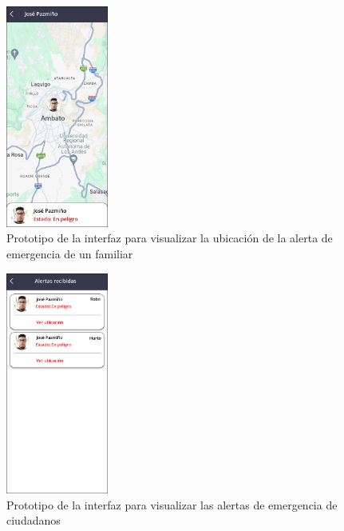 \begin{figure}[H]
      \centering
      \includegraphics[width=0.3\textwidth]{chapters/III-resultados-y-discusion/resources/images/prototipo-ubicacion-alerta-mobile.png}
      \caption{Prototipo de la interfaz para visualizar la ubicación de la alerta de emergencia de un familiar}
      \label{fig:prototipo-ubicacion-alerta-mobile}
\end{figure}

\begin{figure}[H]
      \centering
      \includegraphics[width=0.3\textwidth]{chapters/III-resultados-y-discusion/resources/images/prototipo-alertas-policia.png}
      \caption{Prototipo de la interfaz para visualizar las alertas de emergencia de ciudadanos}
      \label{fig:prototipo-alertas-policia}
\end{figure}

